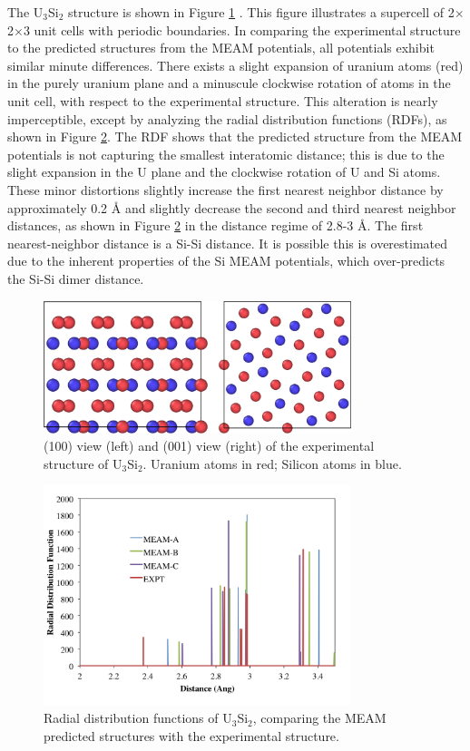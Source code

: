 \documentclass[review]{elsarticle}
\begin{document}
The U$_{3}$Si$_{2}$ structure is shown in Figure \ref{fig:ben1} \cite{zachariasen1949}.  This figure illustrates a supercell of 2$\times$2$\times$3 unit cells with periodic boundaries.  In comparing the experimental structure to the predicted structures from the MEAM potentials, all potentials exhibit similar minute differences.  There exists a slight expansion of uranium atoms (red) in the purely uranium plane and a minuscule clockwise rotation of atoms in the unit cell, with respect to the experimental structure.  This alteration is nearly imperceptible, except by analyzing the radial distribution functions (RDFs), as shown in Figure \ref{fig:benrdf}.  The RDF shows that the predicted structure from the MEAM potentials is not capturing the smallest interatomic distance; this is due to the slight expansion in the U plane and the clockwise rotation of U and Si atoms.  These minor distortions slightly increase the first nearest neighbor distance by approximately 0.2 {\AA} and slightly decrease the second and third nearest neighbor distances, as shown in Figure \ref{fig:benrdf} in the distance regime of 2.8-3 {\AA}.  The first nearest-neighbor distance is a Si-Si distance.  It is possible this is overestimated due to the inherent properties of the Si MEAM potentials, which over-predicts the Si-Si dimer distance.  

\begin{figure}[ht]
	\centering
	\includegraphics[width=0.8\textwidth]{ben1NEW.png}
    \caption{(100) view (left) and (001) view (right) of the experimental structure of U$_{3}$Si$_{2}$.  Uranium atoms in red; Silicon atoms in blue.}\label{fig:ben1}
\end{figure}  

\begin{figure}[ht]
	\centering
	\includegraphics[width=0.8\textwidth]{rdf_image3.png}
    \caption{Radial distribution functions of U$_{3}$Si$_{2}$, comparing the MEAM predicted structures with the experimental structure.}\label{fig:benrdf}
\end{figure}
\end{document}

